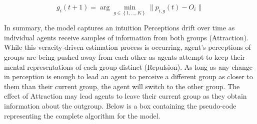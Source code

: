 \[
g_i(t+1) = \arg \min_{g \in \left\{ 1, \dots, K \right\}} \| p_{i,g}(t) - O_i \|
\]

In summary, the model captures an intuition 
Perceptions drift over time as individual agents receive samples of information from both groups (Attraction). 
While this veracity-driven estimation process is occurring, agent's perceptions of groups are being pushed away from each other as agents attempt to keep their mental representations of each group distinct (Repulsion). 
As long as any change in perception is enough to lead an agent to perceive a different group as closer to them than their current group, the agent will switch to the other group. 
The effect of Attraction may lead agents to leave their current group as they obtain information about the outgroup. 
Below is a box containing the pseudo-code representing the complete algorithm for the model. 



